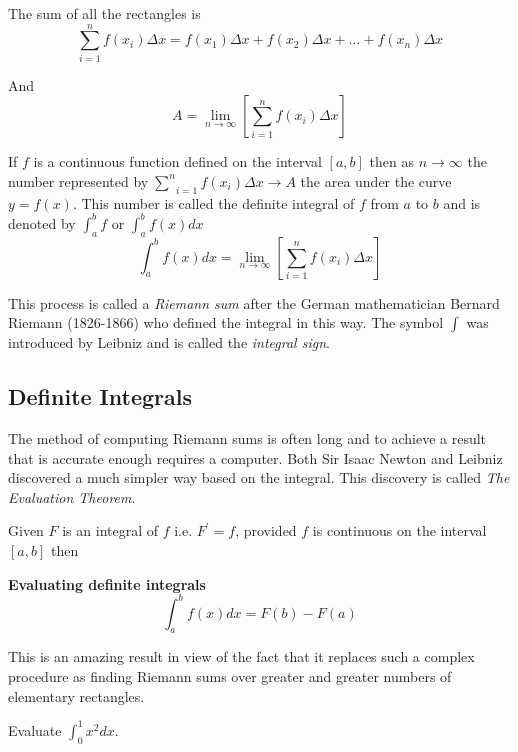 The sum of all the rectangles is
\begin{equation*}\underset{i =1}{\sum ^{n}} f (x_{i})  \Delta x =f \left (x_{1}\right )  \Delta x +f \left (x_{2}\right )  \Delta x +\ldots  +f \left (x_{n}\right )  \Delta x
\end{equation*}

And
\begin{equation*}A =\underset{n \rightarrow \infty }{\lim }\left [\underset{i =1}{\sum ^{n}} f (x_{i})  \Delta x\right ]
\end{equation*}

If $f$ is a continuous function defined on the interval $\left [a ,b\right ]$ then as $n \rightarrow \infty $ the number represented by$\;\underset{i =1}{\sum ^{n}} f (x_{i})  \Delta x \rightarrow A$ the area under the curve $y =f (x)$. This number is called the definite integral of $f$ from $a$ to $b$ and is denoted by $\int _{a}^{b}f$ or $\int _{a}^{b}f (x) d x$
\begin{equation*}\int _{a}^{b}f (x) d x =\underset{n \rightarrow \infty }{\lim }\left [\underset{i =1}{\sum ^{n}} f (x_{i})  \Delta x\right ]
\end{equation*}

This process is called a \emph{Riemann sum} after the German mathematician Bernard Riemann (1826-1866) who defined the integral
in this way. The symbol $\int $ was introduced by Leibniz and is called the \emph{integral sign}. 

\subsection*{Definite Integrals}
The method of computing Riemann sums is often long and to achieve a result that is accurate enough requires a computer. Both Sir Isaac Newton and Leibniz discovered a much simpler way based on the integral. This discovery is called \emph{The Evaluation Theorem}. 

Given $F$ is an integral of $f$ i.e. $F^{ \prime } =f$, provided $f$ is continuous on the interval $\left [a ,b\right ]$ then 
\begin{tcolorbox}
\textbf{Evaluating definite integrals}
\[\int _{a}^{b}f (x) d x =F (b) -F (a)\]
\end{tcolorbox}

This is an amazing result in view of the fact that it replaces such a complex procedure as finding
Riemann sums over greater and greater numbers of elementary rectangles. 

\example Evaluate $\int _{0}^{1}x^{2} d x$. 

